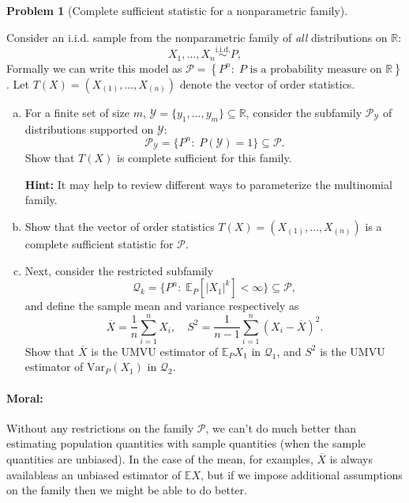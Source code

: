 \documentclass{article}
\newcommand{\cP}{\mathcal{P}}
\newcommand{\cY}{\mathcal{Y}}
\newcommand{\cQ}{\mathcal{Q}}
\newcommand{\EE}{\mathbb{E}}
\newcommand{\PP}{\mathbb{P}}
\newcommand{\RR}{\mathbb{R}}
\newcommand{\simiid}{\overset{\text{i.i.d.}}{\sim}}
\newcommand{\optional}{{\bf Optional:} (Not graded, no extra points) }
\theoremstyle{definition}
\newtheorem{problem}{Problem}
\begin{document}
\begin{problem}[Complete sufficient statistic for a nonparametric family]
\label{prob:complete-nonpar}

Consider an i.i.d. sample from the nonparametric family of {\em all} distributions on $\RR$:
\[
X_1,\ldots,X_n \simiid P,
\]
Formally we can write this model as $\cP = \left\{P^n:\; P \text{ is a probability measure on } \RR\right\}$. Let $T(X) = (X_{(1)},\ldots,X_{(n)})$ denote the vector of order statistics.

\begin{enumerate}[(a)]

\item For a finite set of size $m$, $\cY = \{y_1,\ldots,y_m\} \subseteq \RR$, consider the subfamily $\cP_\cY$ of distributions supported on $\cY$:
  \[
  \cP_\cY = \{P^n:\; P(\cY) = 1\} \subseteq \cP.
  \]
  Show that $T(X)$ is complete sufficient for this family.

{\bf Hint:}  It may help to review different ways to parameterize the multinomial family.



\item Show that the vector of order statistics $T(X) = (X_{(1)},\ldots,X_{(n)})$ is a complete sufficient statistic for $\cP$.



\item Next, consider the restricted subfamily 
\[
\cQ_k = \{P^n:\; \EE_P[|X_1|^k] < \infty\} \subseteq \cP,
\]
and define the sample mean and variance respectively as
\[
\overline X = \frac{1}{n}\sum_{i=1}^n X_i, \quad S^2 = \frac{1}{n-1} \sum_{i=1}^n (X_i - \overline X)^2.
\]
Show that $\overline X$ is the UMVU estimator of $\EE_P X_1$ in $\cQ_1$, and $S^2$ is the UMVU estimator of $\text{Var}_P(X_1)$ in $\cQ_2$.





% 

\end{enumerate}

\paragraph{Moral:} Without any restrictions on the family $\cP$, we can't do much better than estimating population quantities with sample quantities (when the sample quantities are unbiased). In the case of the mean, for examples, $\overline X$ is always availableas an unbiased estimator of $\EE X$, but if we impose additional assumptions on the family then we might be able to do better.
\end{problem}
\end{document}

